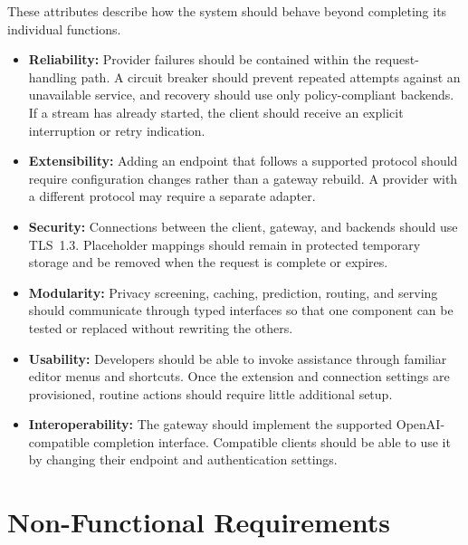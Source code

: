 These attributes describe how the system should behave beyond completing its individual functions.
\begin{itemize}
    \item \textbf{Reliability:} Provider failures should be contained within the request-handling path. A circuit breaker should prevent repeated attempts against an unavailable service, and recovery should use only policy-compliant backends. If a stream has already started, the client should receive an explicit interruption or retry indication.
    \item \textbf{Extensibility:} Adding an endpoint that follows a supported protocol should require configuration changes rather than a gateway rebuild. A provider with a different protocol may require a separate adapter.
    \item \textbf{Security:} Connections between the client, gateway, and backends should use TLS~1.3. Placeholder mappings should remain in protected temporary storage and be removed when the request is complete or expires.
    \item \textbf{Modularity:} Privacy screening, caching, prediction, routing, and serving should communicate through typed interfaces so that one component can be tested or replaced without rewriting the others.
    \item \textbf{Usability:} Developers should be able to invoke assistance through familiar editor menus and shortcuts. Once the extension and connection settings are provisioned, routine actions should require little additional setup.
    \item \textbf{Interoperability:} The gateway should implement the supported OpenAI-compatible completion interface. Compatible clients should be able to use it by changing their endpoint and authentication settings.
\end{itemize}

\section{Non-Functional Requirements}
\label{sec:non-functional-reqs}

